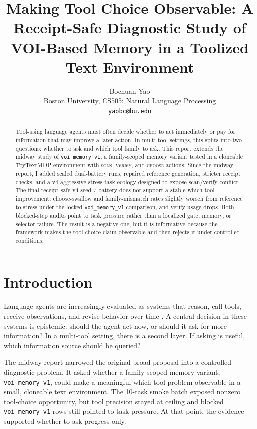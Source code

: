 \documentclass[11pt]{article}
\title{Making Tool Choice Observable: A Receipt-Safe Diagnostic Study of VOI-Based Memory in a Toolized Text Environment}
\author{Bochuan Yao\\
Boston University, CS505: Natural Language Processing\\
\texttt{yaobc@bu.edu}}
\begin{document}
\maketitle

\begin{abstract}
Tool-using language agents must often decide whether to act immediately or pay for information that may improve a later action. In multi-tool settings, this splits into two questions: whether to ask and which tool family to ask. This report extends the midway study of \texttt{voi\_memory\_v1}, a family-scoped memory variant tested in a cloneable ToyTextMDP environment with \textsc{scan}, \textsc{verify}, and \textsc{choose} actions. Since the midway report, I added scaled dual-battery runs, repaired reference generation, stricter receipt checks, and a v4 aggressive-stress task ecology designed to expose scan/verify conflict. The final receipt-safe v4 seed-7 battery does not support a stable which-tool improvement: choose-swallow and family-mismatch rates slightly worsen from reference to stress under the locked \texttt{voi\_memory\_v1} comparison, and verify usage drops. Both blocked-step audits point to task pressure rather than a localized gate, memory, or selector failure. The result is a negative one, but it is informative because the framework makes the tool-choice claim observable and then rejects it under controlled conditions.
\end{abstract}

\section{Introduction}

Language agents are increasingly evaluated as systems that reason, call tools, receive observations, and revise behavior over time \citep{karpas2022mrkl,mialon2023augmented,yao2023react,schick2023toolformer,qin2024toolllm,shinn2023reflexion,liu2024agentbench,jimenez2024swebench}. A central decision in these systems is epistemic: should the agent act now, or should it ask for more information? In a multi-tool setting, there is a second layer. If asking is useful, which information source should be queried?

The midway report narrowed the original broad proposal into a controlled diagnostic problem. It asked whether a family-scoped memory variant, \texttt{voi\_memory\_v1}, could make a meaningful which-tool problem observable in a small, cloneable text environment. The 10-task smoke batch exposed nonzero tool-choice opportunity, but tool precision stayed at ceiling and blocked \texttt{voi\_memory\_v1} rows still pointed to task pressure. At that point, the evidence supported whether-to-ask progress only.
\end{document}
